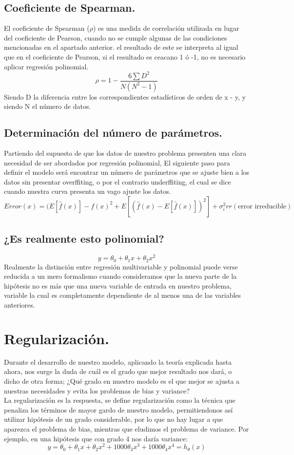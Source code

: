 \documentclass[a4paper,10pt]{article}
\begin{document}
\subsection{Coeficiente de Spearman.}
\noindent
El coeficiente de Spearman ($\rho$) es una medida de correlación utilizada en lugar del coeficiente de Pearson, cuando no se cumple algunas de las condiciones mencionadas en el apartado anterior. el resultado de este se interpreta al igual que en el coeficiente de Pearson, si el resultado es ceacano 1 ó -1, no es necesario aplicar regresión polinomial.
\[
\rho = 1 - \frac{6\sum D^2}{N(N^2 - 1)}
\]
Siendo D la diferencia entre los correspondientes estadísticos de orden de x - y, y siendo N el número de datos.
\subsection{Determinación del número de parámetros.}
\noindent
Partiendo del supuesto de que los datos de nuestro problema presenten una clara necesidad de ser abordados por regresión polinomial, El siguiente paso para definir el modelo será encontrar un número de parámetros que se ajuste bien a los datos sin presentar overffiting, o por el contrario underffiting, el cual se dice cuando nuestra curva presenta un vago ajuste los datos. 
\[
Error (x) = (E[\hat{f}(x)]-f(x)^2+E[(\hat{f}(x)-E[\hat{f}(x)])^2]+\sigma^2_irr (\text{error irreducible})
\]
\subsection{¿Es realmente esto polinomial?}
\noindent
\[
y=\theta_0+\theta_{1}x+\theta_{2}x^2
\]
Realmente la distinción entre regresión multivariable y polinomial puede verse reducida a un mero formalismo cuando consideramos que la nueva parte de la hipótesis no es más que una nueva variable de entrada en nuestro problema, variable la cual es completamente dependiente de al menos una de las variables anteriores.
\section{Regularización.}
\noindent
Durante el desarrollo de nuestro modelo, aplicando la teoría explicada hasta ahora, nos surge la duda de cuál es el grado que mejor resultado nos dará, o dicho de otra forma; ¿Qué grado en nuestro modelo es el que mejor se ajusta a nuestras necesidades y evita los problemas de bias y variance?\\
La regularización es la respuesta, se define regularización como la técnica que penaliza los términos de mayor gardo de nuestro modelo, permitiendonos así utilizar hipótesis de un grado considerable, por lo que no hay lugar a que aparezca el problema de bias, mientras que eludimos el problema de variance. Por ejemplo, en una hipótesis que con grado 4 nos daría variance:
\[
 y=\theta_0+\theta_1 x+\theta_2 x^2+1000\theta_3 x^3+1000\theta_4 x^4 = h_\theta (x)
\]
\end{document}
